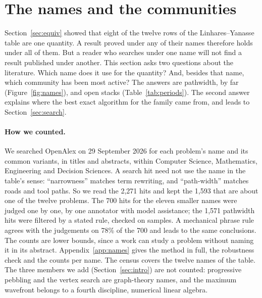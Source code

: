 \section{The names and the communities}
\label{sec:names}

Section~\ref{sec:equiv} showed that eight of the twelve rows of the
Linhares--Yanasse table are one quantity. A result proved under any of their
names therefore holds under all of them. But a reader who searches under one
name will not find a result published under another. This section asks two
questions about the literature. Which name does it use for the quantity? And,
besides that name, which community has been most active? The answers are
pathwidth, by far (Figure~\ref{fig:names}), and open stacks
(Table~\ref{tab:periods}). The second answer explains where the best
exact algorithm for the family came from, and leads to Section~\ref{sec:search}.

\paragraph{How we counted.} We searched OpenAlex \citep{Priem2022} on
29 September 2026 for each problem's name and its common variants, in titles and
abstracts, within Computer Science, Mathematics, Engineering and Decision
Sciences. A search hit need not use the name in the table's sense: ``narrowness''
matches term rewriting, and ``path-width'' matches roads and tool paths. So we
read the 2,271 hits and kept the 1,593 that are about one of the twelve problems.
The 700 hits for the eleven smaller names were judged one by one, by one
annotator with model assistance; the 1,571 pathwidth hits were filtered by a
stated rule, checked on samples. A mechanical phrase rule agrees with the
judgements on 78\% of the 700 and leads to the same conclusions. The counts are
lower bounds, since a work can study a problem without naming it in its
abstract. Appendix~\ref{app:names} gives the method in full, the robustness
check and the counts per name. The census covers the twelve names of the
table. The three members we add (Section~\ref{sec:intro}) are not counted:
progressive pebbling and the vertex search are graph-theory names, and the
maximum wavefront belongs to a fourth discipline, numerical linear algebra.


